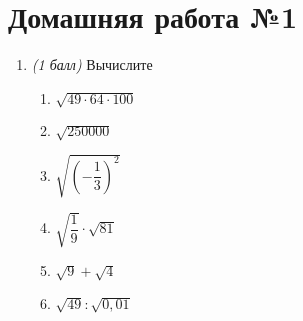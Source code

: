 \documentclass[12pt, a4paper]{article}
\begin{document}
	
	
	\section*{Домашняя работа №1}
	\begin{enumerate}
		\item \textit{(1 балл)} Вычислите
		
		\begin{multicols}{2}
			\begin{enumerate}[label=\asbuk*)]
				\item $\sqrt{49 \cdot 64 \cdot 100}$
				\item $\sqrt{250000}$
				\item $\sqrt{\left( -\dfrac{1}{3}\right)^2 }$
				\item $\sqrt{\dfrac{1}{9}} \cdot \sqrt{81}$
				\item $\sqrt{9}+\sqrt{4}$
				\item $\sqrt{49}:\sqrt{0,01}$
			\end{enumerate}
		\end{multicols}
		
		
		

\end{enumerate}
\end{document}
